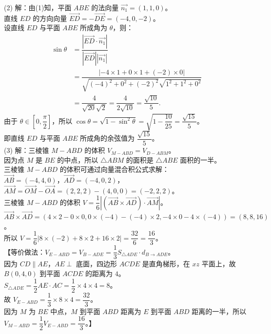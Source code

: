 {  (2) 解：由(1)知，平面 \(ABE\) 的法向量 \(\vec{n_1} = (1,1,0)\)。\\
  直线 \(ED\) 的方向向量 \(\vec{ED} = -\vec{DE} = (-4,0,-2)\)。\\
  设直线 \(ED\) 与平面 \(ABE\) 所成角为 \(\theta\)，则：\\
  \[
  \begin{aligned}
  \sin\theta
  &= \dfrac{|\vec{ED} \cdot \vec{n_1}|}{|\vec{ED}| |\vec{n_1}|} \\
  &= \dfrac{|-4 \times 1 + 0 \times 1 + (-2) \times 0|}
  {\sqrt{(-4)^2+0^2+(-2)^2}\sqrt{1^2+1^2+0^2}} \\
  &= \dfrac{4}{\sqrt{20}\sqrt{2}}
  = \dfrac{4}{2\sqrt{10}}
  = \dfrac{\sqrt{10}}{5}.
  \end{aligned}
  \]
  由于 \(\theta \in \left[0, \dfrac{\pi}{2}\right]\)，所以 \(\cos\theta = \sqrt{1 - \sin^2\theta} = \sqrt{1 - \dfrac{10}{25}} = \dfrac{\sqrt{15}}{5}\)。\\
  即直线 \(ED\) 与平面 \(ABE\) 所成角的余弦值为 \(\dfrac{\sqrt{15}}{5}\)。\\
  
  (3) 解：三棱锥 \(M - ABD\) 的体积 \(V_{M-ABD} = V_{D-ABM}\)。\\
  因为点 \(M\) 是 \(BE\) 的中点，所以 \(\triangle ABM\) 的面积是 \(\triangle ABE\) 面积的一半。\\
  三棱锥 \(M-ABD\) 的体积可通过向量混合积公式求解：\\
  \(\vec{AB} = (-4,4,0)\)，\(\vec{AD} = (-4,0,2)\)，\(\vec{AM} = \vec{OM} - \vec{OA} = (2,2,2) - (4,0,0) = (-2,2,2)\)。\\
  三棱锥 \(M-ABD\) 的体积 \(V = \dfrac{1}{6} \left| (\vec{AB} \times \vec{AD}) \cdot \vec{AM} \right|\)。\\
  \(\vec{AB} \times \vec{AD} = (4 \times 2 - 0 \times 0, 0 \times (-4) - (-4) \times 2, -4 \times 0 - 4 \times (-4)) = (8, 8, 16)\)。\\
  所以 \(V = \dfrac{1}{6} |8 \times (-2) + 8 \times 2 + 16 \times 2| = \dfrac{32}{6} = \dfrac{16}{3}\)。\\
  【等价做法：\(V_{E-ABD} = V_{B-ADE} = \dfrac{1}{3} S_{\triangle ADE} \cdot d_{B \to ADE}\)。\\
  因为 \(CD \parallel AE\)，\(AE \perp\) 底面，四边形 \(ACDE\) 是直角梯形，在 \(xz\) 平面上，故 \(B(0,4,0)\) 到平面 \(ACDE\) 的距离为 \(4\)。\\
  \(S_{\triangle ADE} = \dfrac{1}{2} AE \cdot AC = \dfrac{1}{2} \times 4 \times 4 = 8\)。\\
  故 \(V_{E-ABD} = \dfrac{1}{3} \times 8 \times 4 = \dfrac{32}{3}\)。\\
  因为 \(M\) 为 \(BE\) 中点，\(M\) 到平面 \(ABD\) 距离为 \(E\) 到平面 \(ABD\) 距离的一半，所以 \(V_{M-ABD} = \dfrac{1}{2} V_{E-ABD} = \dfrac{16}{3}\)。】%
}

\newcommand{\qSolidPentahedronPropertiesDiagnosis}{%
  （留白待收集学生作答后补充）%
}

\newcommand{\qSolidPentahedronPropertiesTeachingNotes}{%
  精讲。本题考查建系法解决面面垂直与线面角，以及灵活运用等体积法或坐标混合积求体积。%
}
